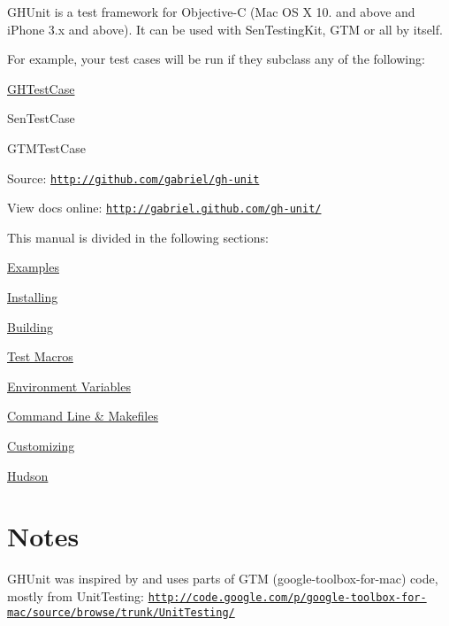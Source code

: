 \-G\-H\-Unit is a test framework for \-Objective-\/\-C (\-Mac \-O\-S \-X 10. and above and i\-Phone 3.\-x and above). \-It can be used with \-Sen\-Testing\-Kit, \-G\-T\-M or all by itself.

\-For example, your test cases will be run if they subclass any of the following\-:


\begin{DoxyItemize}
\item \hyperlink{interface_g_h_test_case}{\-G\-H\-Test\-Case}
\item \-Sen\-Test\-Case
\item \-G\-T\-M\-Test\-Case
\end{DoxyItemize}

\-Source\-: \href{http://github.com/gabriel/gh-unit}{\tt http\-://github.\-com/gabriel/gh-\/unit}

\-View docs online\-: \href{http://gabriel.github.com/gh-unit/}{\tt http\-://gabriel.\-github.\-com/gh-\/unit/}

\-This manual is divided in the following sections\-:
\begin{DoxyItemize}
\item \hyperlink{_examples}{\-Examples}
\item \hyperlink{_installing}{\-Installing}
\item \hyperlink{_building}{\-Building}
\item \hyperlink{_test_macros}{\-Test \-Macros}
\item \hyperlink{_env_variables}{\-Environment \-Variables}
\item \hyperlink{_command_line}{\-Command \-Line \& \-Makefiles}
\item \hyperlink{_customizing}{\-Customizing}
\item \hyperlink{_hudson}{\-Hudson}
\end{DoxyItemize}



\hypertarget{index_Notes}{}\section{\-Notes}\label{index_Notes}
\-G\-H\-Unit was inspired by and uses parts of \-G\-T\-M (google-\/toolbox-\/for-\/mac) code, mostly from \-Unit\-Testing\-: \href{http://code.google.com/p/google-toolbox-for-mac/source/browse/trunk/UnitTesting/}{\tt http\-://code.\-google.\-com/p/google-\/toolbox-\/for-\/mac/source/browse/trunk/\-Unit\-Testing/} 